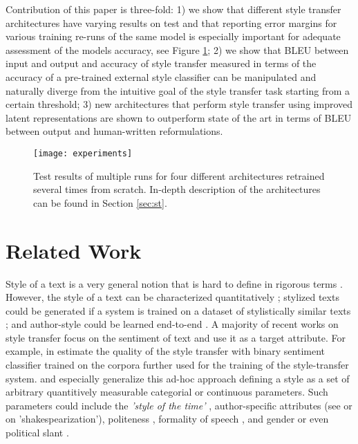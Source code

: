 \documentclass[11pt,a4paper]{article}
\begin{document}
Contribution of this paper is three-fold: 1) we show that different style transfer architectures have varying results on test and that reporting error margins for various training re-runs of the same model is especially important for adequate assessment of the models accuracy, see Figure \ref{pic:ex}; 2) we show that BLEU \cite{Papineni} between input and output and accuracy of style transfer measured in terms of the accuracy of a pre-trained external style classifier can be manipulated and naturally diverge from the intuitive goal of the style transfer task starting from a certain threshold; 3) new architectures that perform style transfer using improved latent representations are shown to outperform state of the art in terms of BLEU between output and human-written reformulations.

\begin{figure}[ht]
\begin{center}
\centerline{\texttt{[image: experiments]}}
\caption{Test results of multiple runs for four different architectures retrained several times from scratch. In-depth description of the architectures can be found in Section \ref{sec:st}.}
\label{pic:ex}
\end{center}
\end{figure}

\section{Related Work}
\label{sec:rw}
 
Style of a text is a very general notion that is hard to define in rigorous terms \cite{Xu3}. However, the style of a text can be characterized quantitatively \cite{Hughes}; stylized texts could be generated if a system is trained on a dataset of stylistically similar texts \cite{Potash}; and author-style could be learned end-to-end \cite{TY, TYwilde, Vechtomova}. A majority of recent works on style transfer focus on the sentiment of text and use it as a target attribute. For example, in \cite{li, Kabbara, Xu2} estimate the quality of the style transfer with binary sentiment classifier trained on the corpora further used for the training of the style-transfer system. \cite{Ficler} and especially \cite{fu2} generalize this ad-hoc approach defining a style as a set of arbitrary quantitively measurable categorial or continuous parameters. Such parameters could include the \textit{'style of the time'} \cite{Hughes}, author-specific attributes (see \cite{xu} or \cite{Jhamtani} on 'shakespearization'), politeness \cite{Sennrich}, formality of speech \cite{Rao}, and gender or even political slant \cite{Prabhumoye}. 
\end{document}
